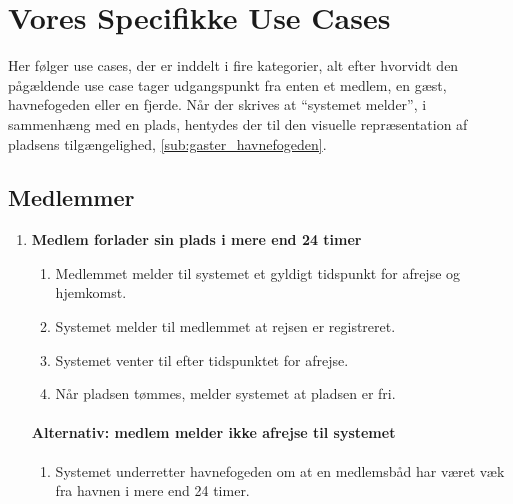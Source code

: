 \section{Vores Specifikke Use Cases}
Her følger use cases, der er inddelt i fire kategorier, alt efter hvorvidt den pågældende use case tager udgangspunkt fra enten et medlem, en gæst, havnefogeden eller en fjerde. Når der skrives at \enquote{systemet melder}, i sammenhæng med en plads, hentydes der til den visuelle repræsentation af pladsens tilgængelighed, \cref{sub:gaster_havnefogeden}.

\subsection{Medlemmer}  
  \begin{enumerate}

    \item{\bf{Medlem forlader sin plads i mere end 24 timer}}
      \begin{enumerate}
        \item Medlemmet melder til systemet et gyldigt tidspunkt for afrejse og hjemkomst.
        \item Systemet melder til medlemmet at rejsen er registreret.
        \item Systemet venter til efter tidspunktet for afrejse.
        \item Når pladsen tømmes, melder systemet at pladsen er fri.
      \end{enumerate}

    \paragraph{Alternativ: medlem melder ikke afrejse til systemet}
      \begin{enumerate}
        \item Systemet underretter havnefogeden om at en medlemsbåd har været væk fra havnen i mere end 24 timer.
      \end{enumerate}



\end{enumerate}
